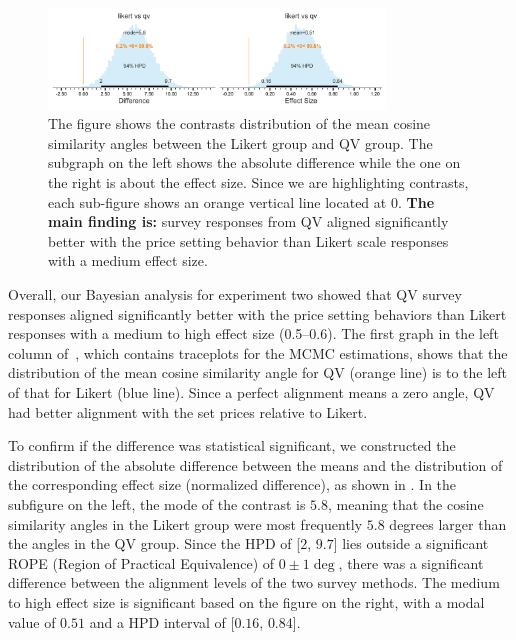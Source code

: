 \begin{figure}[htpb]
  \centering
  \includegraphics[trim= 0in 0in 0in 0in, clip, width=0.8\textwidth, keepaspectratio=true]{"content/image/Votes_Prices_StudentT_differences_and_effects.pdf"}
  \caption{
    The figure shows the contrasts distribution of the mean cosine similarity angles between the Likert group and QV group. The subgraph on the left shows the absolute difference while the one on the right is about the effect size. Since we are highlighting contrasts, each sub-figure shows an orange vertical line located at 0. \textbf{The main finding is:} survey responses from QV aligned significantly better with the price setting behavior than Likert scale responses with a medium effect size.
  }
  \label{fig:contrast_exp2}
\end{figure}

Overall, our Bayesian analysis for experiment two showed that QV survey responses aligned significantly better with the price setting behaviors than Likert responses with a medium to high effect size (0.5--0.6). The first graph in the left column of~, which contains traceplots for the MCMC estimations, shows that the distribution of the mean cosine similarity angle for QV (orange line) is to the left of that for Likert (blue line). Since a perfect alignment means a zero angle, QV had better alignment with the set prices relative to Likert. 

To confirm if the difference was statistical significant, we constructed the distribution of the absolute difference between the means and the distribution of the corresponding effect size (normalized difference), as shown in . In the subfigure on the left, the mode of the contrast is $5.8$, meaning that the cosine similarity angles in the Likert group were most frequently $5.8$ degrees larger than the angles in the QV group. Since the HPD of [$2$, $9.7$] lies outside a significant ROPE (Region of Practical Equivalence) of $0 \pm 1 \deg$, there was a significant difference between the alignment levels of the two survey methods. The medium to high effect size is significant based on the figure on the right, with a modal value of $0.51$ and a HPD interval of [$0.16$, $0.84$].


